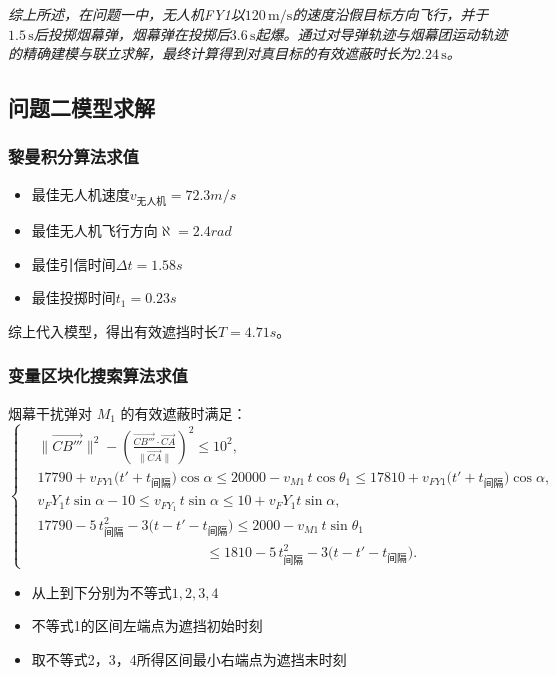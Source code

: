 \documentclass{article}
\begin{document}
\textit{综上所述，在问题一中，无人机FY1以$120\,\mathrm{m/s}$的速度沿假目标方向飞行，并于$1.5\,\mathrm{s}$后投掷烟幕弹，烟幕弹在投掷后$3.6\,\mathrm{s}$起爆。通过对导弹轨迹与烟幕团运动轨迹的精确建模与联立求解，最终计算得到对真目标的有效遮蔽时长为$2.24\,\mathrm{s}$。}

\subsection{问题二模型求解}
\subsubsection{黎曼积分算法求值}
\begin{itemize}
    \item 最佳无人机速度$v_\text{无人机}=72.3m /s$
    \item 最佳无人机飞行方向$\aleph = 2.4rad$
    \item 最佳引信时间$\Delta t = 1.58s$
    \item 最佳投掷时间$t_1 = 0.23s$
\end{itemize}
综上代入模型，得出有效遮挡时长$T = 4.71s$。
\subsubsection{变量区块化搜索算法求值}
\begin{center}
烟幕干扰弹对 $M_1$ 的有效遮蔽时满足：
\[
\left\{
\begin{aligned}
&\bigl\|\overrightarrow{CB'''}\bigr\|^{2}
- \left(\frac{\overrightarrow{CB'''}\cdot\overrightarrow{CA}}{\|\overrightarrow{CA}\|}\right)^{2}
\le 10^{2}, \\[4pt]
&17790+v_{FY1}\bigl(t'+t_{\text{间隔}}\bigr)\cos\alpha
\le 20000 - v_{M1}\,t\cos\theta_1
\le 17810+v_{FY1}\bigl(t'+t_{\text{间隔}}\bigr)\cos\alpha, \\[4pt]
&v_FY_1 t \sin\alpha-10 \le v_{FY_1}\,t\sin\alpha \le 10+v_FY_1 t \sin \alpha
, \\[4pt]
&17790-5\,t_{\text{间隔}}^{2}-3\bigl(t-t'-t_{\text{间隔}}\bigr)
\le 2000 - v_{M1}\,t\sin\theta_1 \\ 
&\qquad\qquad\qquad\qquad\qquad\qquad
\le 1810-5\,t_{\text{间隔}}^{2}-3\bigl(t-t'-t_{\text{间隔}}\bigr).
\end{aligned}
\right.
\]
\end{center}


\begin{itemize}
    \item 从上到下分别为不等式$1,2,3,4$
    \item 不等式1的区间左端点为遮挡初始时刻
    \item 取不等式2，3，4所得区间最小右端点为遮挡末时刻
\end{itemize}
\end{document}
